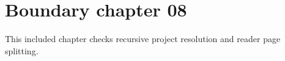 \section{Boundary chapter 08}
\label{sec:boundary-08}
This included chapter checks recursive project resolution and reader page splitting.
